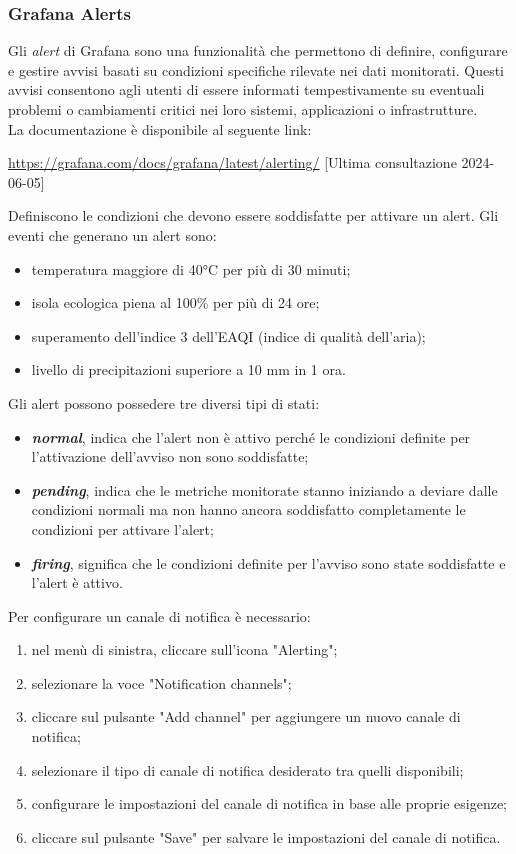\subsubsection{Grafana Alerts}
Gli \textit{alert} di Grafana sono una funzionalità che permettono di definire, configurare e gestire avvisi basati su condizioni specifiche rilevate nei dati monitorati. Questi avvisi consentono agli utenti di essere informati tempestivamente su eventuali problemi o cambiamenti critici nei loro sistemi, applicazioni o infrastrutture.\\
La documentazione è disponibile al seguente link:
\begin{center}
	\url{https://grafana.com/docs/grafana/latest/alerting/} [Ultima consultazione 2024-06-05]
\end{center}

Definiscono le condizioni che devono essere soddisfatte per attivare un alert. Gli eventi che generano un alert sono:
\begin{itemize}
	\item temperatura maggiore di 40°C per più di 30 minuti;
	\item isola ecologica piena al 100\% per più di 24 ore;
	\item superamento dell'indice 3 dell'EAQI (indice di qualità dell'aria);
	\item livello di precipitazioni superiore a 10 mm in 1 ora.
\end{itemize}
Gli alert possono possedere tre diversi tipi di stati:
\begin{itemize}
	\item \textbf{\textit{normal}}, indica che l'alert non è attivo perché le condizioni definite per l'attivazione dell'avviso non sono soddisfatte;
	\item \textbf{\textit{pending}}, indica che le metriche monitorate stanno iniziando a deviare dalle condizioni normali ma non hanno ancora soddisfatto completamente le condizioni per attivare l'alert;
	\item \textbf{\textit{firing}}, significa che le condizioni definite per l'avviso sono state soddisfatte e l'alert è attivo.
\end{itemize}
Per configurare un canale di notifica è necessario:
\begin{enumerate}
	\item nel menù di sinistra, cliccare sull'icona "Alerting";
	\item selezionare la voce "Notification channels";
	\item cliccare sul pulsante "Add channel" per aggiungere un nuovo canale di notifica;
	\item selezionare il tipo di canale di notifica desiderato tra quelli disponibili;
	\item configurare le impostazioni del canale di notifica in base alle proprie esigenze;
	\item cliccare sul pulsante "Save" per salvare le impostazioni del canale di notifica.
\end{enumerate}

